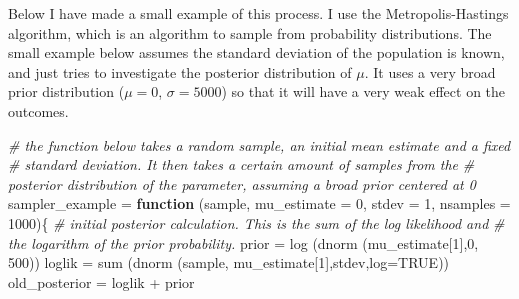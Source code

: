 \documentclass[
]{book}
\newenvironment{Shaded}{\begin{snugshade}}{\end{snugshade}}
\newcommand{\AttributeTok}[1]{\textcolor[rgb]{0.77,0.63,0.00}{#1}}
\newcommand{\CommentTok}[1]{\textcolor[rgb]{0.56,0.35,0.01}{\textit{#1}}}
\newcommand{\ConstantTok}[1]{\textcolor[rgb]{0.00,0.00,0.00}{#1}}
\newcommand{\ControlFlowTok}[1]{\textcolor[rgb]{0.13,0.29,0.53}{\textbf{#1}}}
\newcommand{\DecValTok}[1]{\textcolor[rgb]{0.00,0.00,0.81}{#1}}
\newcommand{\FunctionTok}[1]{\textcolor[rgb]{0.00,0.00,0.00}{#1}}
\newcommand{\NormalTok}[1]{#1}
\newcommand{\OtherTok}[1]{\textcolor[rgb]{0.56,0.35,0.01}{#1}}
\newcommand{\SpecialCharTok}[1]{\textcolor[rgb]{0.00,0.00,0.00}{#1}}
\begin{document}
Below I have made a small example of this process. I use the Metropolis-Hastings algorithm, which is an algorithm to sample from probability distributions. The small example below assumes the standard deviation of the population is known, and just tries to investigate the posterior distribution of \(\mu\). It uses a very broad prior distribution (\(\mu = 0\), \(\sigma = 5000\)) so that it will have a very weak effect on the outcomes.

\begin{Shaded}
\begin{Highlighting}[]
\CommentTok{\# the function below takes a random sample, an initial mean estimate and a fixed}
\CommentTok{\# standard deviation. It then takes a certain amount of samples from the }
\CommentTok{\# posterior distribution of the parameter, assuming a broad prior centered at 0}
\NormalTok{sampler\_example }\OtherTok{=} \ControlFlowTok{function}\NormalTok{ (sample, }\AttributeTok{mu\_estimate =} \DecValTok{0}\NormalTok{, }\AttributeTok{stdev =} \DecValTok{1}\NormalTok{, }\AttributeTok{nsamples =} \DecValTok{1000}\NormalTok{)\{}
  \CommentTok{\# initial posterior calculation. This is the sum of the log likelihood and}
  \CommentTok{\# the logarithm of the prior probability.}
\NormalTok{  prior }\OtherTok{=} \FunctionTok{log}\NormalTok{ (}\FunctionTok{dnorm}\NormalTok{ (mu\_estimate[}\DecValTok{1}\NormalTok{],}\DecValTok{0}\NormalTok{, }\DecValTok{500}\NormalTok{))}
\NormalTok{  loglik }\OtherTok{=} \FunctionTok{sum}\NormalTok{ (}\FunctionTok{dnorm}\NormalTok{ (sample, mu\_estimate[}\DecValTok{1}\NormalTok{],stdev,}\AttributeTok{log=}\ConstantTok{TRUE}\NormalTok{))}
\NormalTok{  old\_posterior }\OtherTok{=}\NormalTok{ loglik }\SpecialCharTok{+}\NormalTok{ prior}
  

\end{Highlighting}
\end{Shaded}
\end{document}

